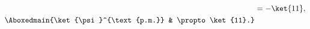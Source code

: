 \documentclass[./../main.tex]{subfiles}
\begin{document}
\begin{enumerate}
\begin{align*}
		                                           & = -\ket{11},                                                                                                                                                                                                                                                                                                                                                                                                                                                                                     \\
		      \Aboxedmain{\ket{\psi}^{\text{p.m.}} & \propto \ket{11}.}
	      \end{align*}
\end{enumerate}
\end{document}
